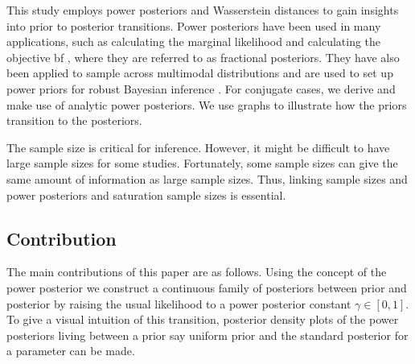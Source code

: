 \documentclass[12pt]{article}
\begin{document}
This study employs power posteriors and Wasserstein distances to gain insights into prior to posterior transitions. Power posteriors have been used in many applications, such as calculating the marginal  likelihood \citep{friel2008marginal} and calculating the objective \gls{bf} \citep{ohaganPropertiesIntrinsicFractional1997}, where they are referred to as fractional posteriors. They have also been applied to sample across multimodal distributions and are used to set up power priors \citep{Dimitris_2015, Joseph_2000} for robust Bayesian inference  \citep{Jeffrey_2019}. For conjugate cases, we derive and make use of analytic power posteriors. We use graphs to illustrate how the priors transition to the posteriors.  


The sample size is critical for inference. However, it might be difficult to have large sample sizes for some studies. Fortunately, some sample sizes can give the same amount of information as large sample sizes. Thus, linking sample sizes and power posteriors and saturation sample sizes is essential. 

\subsection{Contribution}
The main contributions of this paper are as follows. Using the concept of the power posterior we construct a continuous family of posteriors between prior and posterior by raising the usual likelihood to a power posterior constant $\gamma \in [0, 1]$. To give a visual intuition of this transition, posterior density plots of the power posteriors living between a prior say uniform prior and the standard posterior for a parameter can be made.
\end{document}

